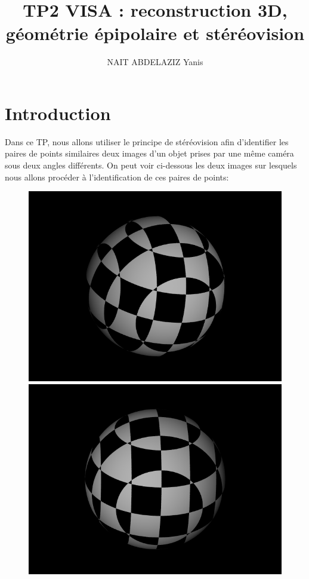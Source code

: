 \documentclass[a4paper,12pt]{report}
\title{TP2 VISA : reconstruction 3D, géométrie épipolaire et stéréovision}
\author{NAIT ABDELAZIZ Yanis}
\begin{document}
\maketitle
\section*{Introduction}
Dans ce TP, nous allons utiliser le principe de stéréovision afin d'identifier les paires de points similaires deux images  d'un objet prises par une même caméra sous deux angles différents. On peut voir ci-dessous les deux images sur lesquels nous allons procéder à l'identification de ces paires de points:
\begin{figure}[!ht]
	\center
	\includegraphics[scale=0.3]{image/left.png}
	\includegraphics[scale=0.3]{image/right.png}
\end{figure}
\end{document}
